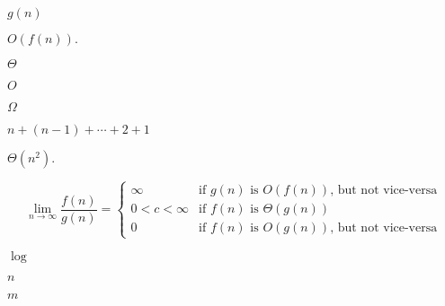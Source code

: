 \documentclass[10pt]{book}
\begin{document}
\begin{mdSnippets}
\begin{mdInlineSnippet}%
$g(n)$\end{mdInlineSnippet}%
\begin{mdInlineSnippet}[b885783116f33cd1ec95f1d4b0fc9778]%
$O(f(n)).$\end{mdInlineSnippet}%
\begin{mdInlineSnippet}[b9dce96eb3d5a71b28f9f198c28d2d1b]%
$\Theta$\end{mdInlineSnippet}%
\begin{mdInlineSnippet}[f186217753c37b9b9f958d906208506e]%
$O$\end{mdInlineSnippet}%
\begin{mdInlineSnippet}[2e9ef3d6ef62a48d70720728d3e90e31]%
$\Omega$\end{mdInlineSnippet}%
\begin{mdInlineSnippet}[ad47bf3027463584a63b3c20ff6052ef]%
$n + (n-1) + \cdots + 2 + 1$\end{mdInlineSnippet}%
\begin{mdInlineSnippet}%
$\Theta(n^2).$\end{mdInlineSnippet}%
\begin{mdDisplaySnippet}[341c48e35a0747c4707a3c33723081d9]%
\[%
\lim_{n \to \infty} \frac{f(n)}{g(n)} = \begin{cases}
\infty &\text{if $g(n)$ is $O(f(n))$, but not vice-versa} \\
0<c<\infty &\text{if $f(n)$ is $\Theta(g(n))$} \\
0 &\text{if $f(n)$ is $O(g(n))$, but not vice-versa}
\end{cases}
\]%
\end{mdDisplaySnippet}%
\begin{mdInlineSnippet}%
$\log$\end{mdInlineSnippet}%
\begin{mdInlineSnippet}[7b8b965ad4bca0e41ab51de7b31363a1]%
$n$\end{mdInlineSnippet}%
\begin{mdInlineSnippet}[6f8f57715090da2632453988d9a1501b]%
$m$\end{mdInlineSnippet}%
\begin{mdInlineSnippet}[525d849c3969e5423145b98445cd7bb5]%

\end{mdInlineSnippet}
\end{mdSnippets}
\end{document}
